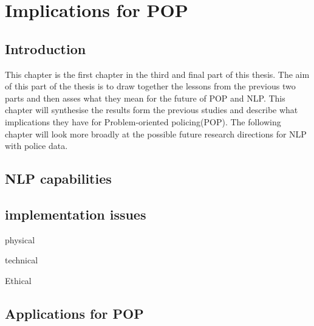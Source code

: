 \chapter{Implications for POP}


\section{Introduction} This chapter is the first chapter in the third and final part of this thesis. The aim of this part of the thesis is to draw together the lessons from the previous two parts and then asses what they mean for the future of POP and NLP.  This chapter will synthesise the results form the previous studies and describe what implications they have for Problem-oriented policing(POP). The following chapter will look more broadly at the possible future research directions for NLP with police data.

\section{NLP capabilities}

\section{implementation issues}

physical

technical

Ethical

\section{Applications for POP}




